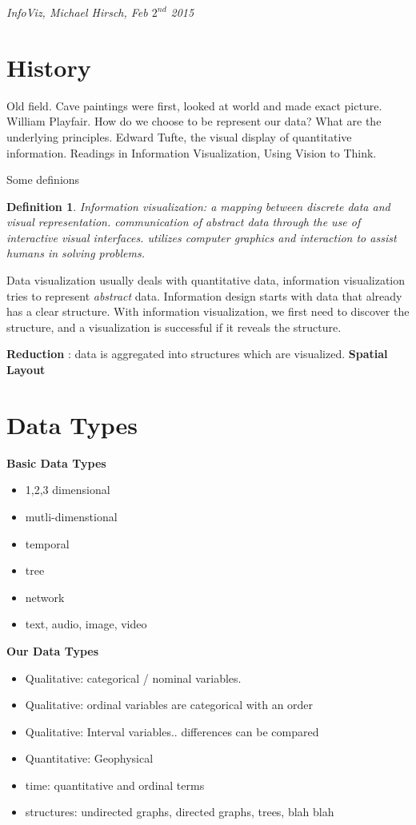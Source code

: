 \documentclass[]{article}
\newtheorem{mydef}{Definition}[section]
\begin{document}
\begin{flushright}
	\textit{InfoViz, Michael Hirsch, Feb $2^{nd}$ 2015}
\end{flushright}

\section{History}
Old field. Cave paintings were first, looked at world and made exact picture. William Playfair. How do we choose to be represent our data? What are the underlying principles. Edward Tufte, the visual display of quantitative information. Readings in Information Visualization, Using Vision to Think.

Some definions

\begin{mydef}
Information visualization: a mapping between discrete data and visual representation. communication of abstract data through the use of interactive visual interfaces. utilizes computer graphics and interaction to assist humans in solving problems.
\end{mydef}

Data visualization usually deals with quantitative data, information visualization tries to represent \textit{abstract} data. Information design starts with data that already has a clear structure. With information visualization, we first need to discover the structure, and a visualization is successful if it reveals the structure. 

\textbf{Reduction} : data is aggregated into structures which are visualized.
\textbf{Spatial Layout}

\section{Data Types}

\textbf{Basic Data Types}
\begin{itemize}
\setlength\itemsep{0em}
	\item 1,2,3 dimensional
	\item mutli-dimenstional
	\item temporal
	\item tree
	\item network
	\item text, audio, image, video
\end{itemize}

\textbf{Our Data Types}
\begin{itemize}
\setlength\itemsep{0em}
	\item Qualitative: categorical / nominal variables. 
	\item Qualitative: ordinal variables are categorical with an order
	\item Qualitative: Interval variables.. differences can be compared
	\item Quantitative: Geophysical
	\item time: quantitative and ordinal terms
	\item structures: undirected graphs, directed graphs, trees, blah blah
\end{itemize}
\end{document}
